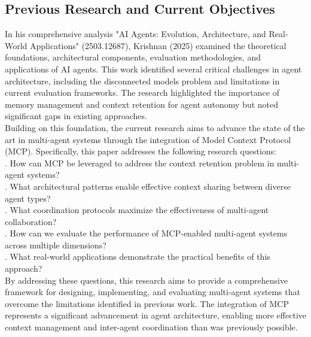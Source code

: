 \subsection{Previous Research and Current Objectives}
In his comprehensive analysis "AI Agents: Evolution, Architecture, and Real-World Applications" (2503.12687), Krishnan (2025) examined the theoretical foundations, architectural components, evaluation methodologies, and applications of AI agents. This work identified several critical challenges in agent architecture, including the disconnected models problem and limitations in current evaluation frameworks. The research highlighted the importance of memory management and context retention for agent autonomy but noted significant gaps in existing approaches.\\ \newline
Building on this foundation, the current research aims to advance the state of the art in multi-agent systems through the integration of Model Context Protocol (MCP). Specifically, this paper addresses the following research questions:\\ . How can MCP be leveraged to address the context retention problem in multi-agent systems?\\ . What architectural patterns enable effective context sharing between diverse agent types?\\ . What coordination protocols maximize the effectiveness of multi-agent collaboration?\\ . How can we evaluate the performance of MCP-enabled multi-agent systems across multiple dimensions?\\ . What real-world applications demonstrate the practical benefits of this approach?\\ \newline
By addressing these questions, this research aims to provide a comprehensive framework for designing, implementing, and evaluating multi-agent systems that overcome the limitations identified in previous work. The integration of MCP represents a significant advancement in agent architecture, enabling more effective context management and inter-agent coordination than was previously possible.\\
